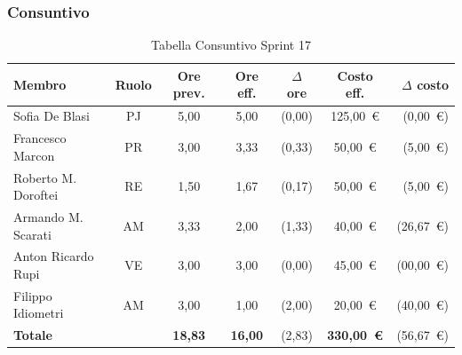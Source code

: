\subsubsection{Consuntivo}
\begin{table}[H]
    \centering
    \renewcommand{\arraystretch}{1.3}
    \begin{tabularx}{\textwidth}{|X|c|c|c|c|c|r|}
        \hline
        \textbf{Membro} & \textbf{Ruolo} & \textbf{Ore prev.} &
        \textbf{Ore eff.} & \textbf{$\Delta$ ore} &
        \textbf{Costo eff.} & \textbf{$\Delta$ costo} \\
        \hline
        Sofia De Blasi       & PJ & 5,00 & 5,00 & {\color{green}(0,00)}  & 125{,}00~\euro & {\color{green}(0{,}00~\euro)} \\
        Francesco Marcon     & PR & 3,00 & 3,33 & {\color{red}(0,33)}  & 50{,}00~\euro & {\color{red}(5{,}00~\euro)} \\
        Roberto M. Doroftei  & RE & 1,50 & 1,67 & {\color{red}(0,17)} & 50{,}00~\euro & {\color{red}(5{,}00~\euro)} \\
        Armando M. Scarati   & AM & 3,33 & 2,00 & {\color{green}(1,33)} & 40{,}00~\euro & {\color{green}(26{,}67~\euro)} \\
        Anton Ricardo Rupi   & VE & 3,00 & 3,00 & {\color{green}(0,00)} & 45{,}00~\euro & {\color{green}(00{,}00~\euro)} \\
        Filippo Idiometri    & AM & 3,00 & 1,00 & {\color{green}(2,00)} & 20{,}00~\euro & {\color{green}(40{,}00~\euro)} \\
        \hline
        \textbf{Totale} & & \textbf{18,83} & \textbf{16,00} & {\color{green}(2,83)} & \textbf{330{,}00~\euro} & {\color{green}(56{,}67~\euro)} \\
        \hline
    \end{tabularx}
    \caption{Tabella Consuntivo Sprint 17}
\end{table}

